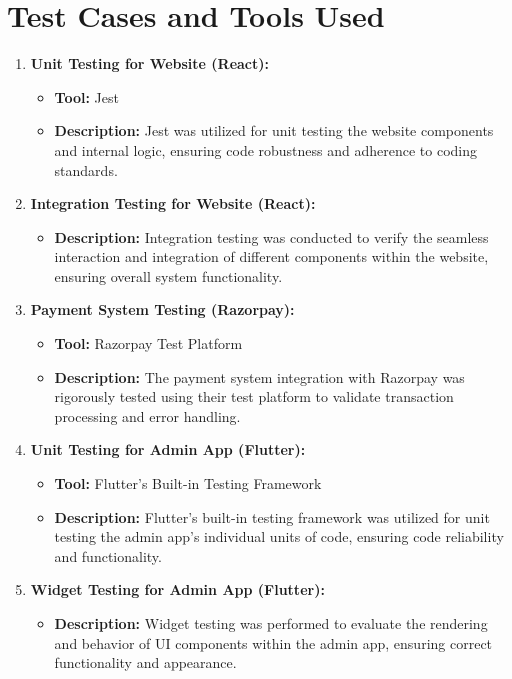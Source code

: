 \documentclass[12pt,a4paper]{report}
\begin{document}
\section{Test Cases and Tools Used}

\begin{enumerate}
    \item \textbf{Unit Testing for Website (React):}
          \begin{itemize}
              \item \textbf{Tool:} Jest
              \item \textbf{Description:} Jest was utilized for unit testing the website components and internal logic, ensuring code robustness and adherence to coding standards.
          \end{itemize}

    \item \textbf{Integration Testing for Website (React):}
          \begin{itemize}
              \item \textbf{Description:} Integration testing was conducted to verify the seamless interaction and integration of different components within the website, ensuring overall system functionality.
          \end{itemize}

    \item \textbf{Payment System Testing (Razorpay):}
          \begin{itemize}
              \item \textbf{Tool:} Razorpay Test Platform
              \item \textbf{Description:} The payment system integration with Razorpay was rigorously tested using their test platform to validate transaction processing and error handling.
          \end{itemize}

    \item \textbf{Unit Testing for Admin App (Flutter):}
          \begin{itemize}
              \item \textbf{Tool:} Flutter's Built-in Testing Framework
              \item \textbf{Description:} Flutter's built-in testing framework was utilized for unit testing the admin app's individual units of code, ensuring code reliability and functionality.
          \end{itemize}

    \item \textbf{Widget Testing for Admin App (Flutter):}
          \begin{itemize}
              \item \textbf{Description:} Widget testing was performed to evaluate the rendering and behavior of UI components within the admin app, ensuring correct functionality and appearance.
          \end{itemize}


\end{enumerate}
\end{document}
